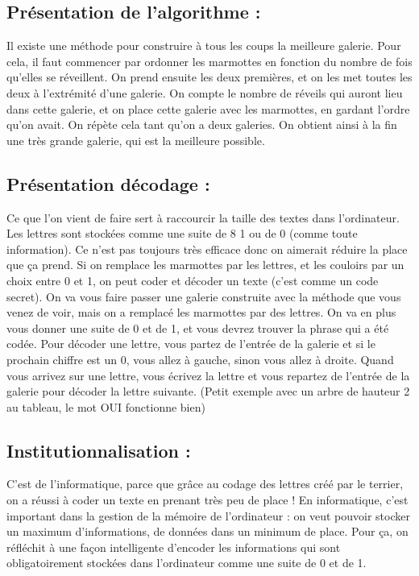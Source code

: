 \documentclass[12pt, a4paper]{article}
\begin{document}
\subsection*{Présentation de l'algorithme :}
Il existe une méthode pour construire à tous les coups la meilleure galerie. Pour cela, il faut commencer par ordonner les marmottes
en fonction du nombre de fois qu’elles se réveillent. On prend ensuite les deux premières, et on les met toutes les deux à l’extrémité
d’une galerie. On compte le nombre de réveils qui auront lieu dans cette galerie, et on place cette galerie avec les marmottes, en
gardant l’ordre qu’on avait. On répète cela tant qu’on a deux galeries. On obtient ainsi à la fin une très grande galerie, qui
est la meilleure possible.

\subsection*{Présentation décodage :}
Ce que l’on vient de faire sert à raccourcir la taille des textes dans l’ordinateur. Les lettres sont stockées comme une suite de 8 1 ou
de 0 (comme toute information). Ce n’est pas toujours très efficace donc on aimerait réduire la place que ça prend. Si on remplace les
marmottes par les lettres, et les couloirs par un choix entre 0 et 1, on peut coder et décoder un texte (c'est comme un code secret).
On va vous faire passer une galerie construite avec la méthode que vous venez de voir, mais on a remplacé les marmottes par des lettres.
On va en plus vous donner une suite de 0 et de 1, et vous devrez trouver la phrase qui a été codée. Pour décoder une lettre, vous partez
de l’entrée de la galerie et si le prochain chiffre est un 0, vous allez à gauche, sinon vous allez à droite. Quand vous arrivez sur une
lettre, vous écrivez la lettre et vous repartez de l’entrée de la galerie pour décoder la lettre suivante. (Petit exemple avec un
arbre de hauteur 2 au tableau, le mot OUI fonctionne bien)

\subsection*{Institutionnalisation :}
C’est de l’informatique, parce que grâce au codage des lettres créé par le terrier, on a réussi à coder un texte en prenant très peu de place !
En informatique, c’est important dans la gestion de la mémoire de l’ordinateur : on veut pouvoir stocker un maximum d’informations, de données
dans un minimum de place. Pour ça, on réfléchit à une façon intelligente d’encoder les informations qui sont obligatoirement stockées dans
l’ordinateur comme une suite de 0 et de 1.
\end{document}
